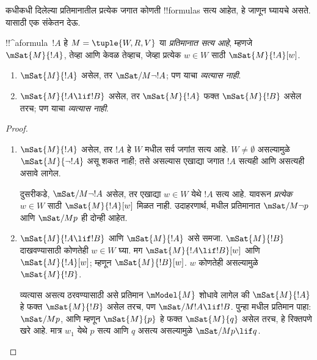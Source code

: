 \documentclass[../../../include/open-logic-section]{subfiles}
\begin{document}


कधीकधी दिलेल्या प्रतिमानातील प्रत्येक जगात कोणती !!{formula}s सत्य
आहेत, हे जाणून घ्यायचे असते. यासाठी एक संकेतन देऊ.

\begin{defn}
  !!^a{formula}~$!A$ हे $M = \tuple{W, R,
    V}$ या \emph{प्रतिमानात सत्य आहे}, म्हणजे $\mSat{M}{!A}$,
  तेव्हा आणि केवळ तेव्हाच, जेव्हा प्रत्येक $w \in W$ साठी
  $\mSat{M}{!A}[w]$.
\end{defn}

\begin{prop}
  \begin{enumerate}
  \item $\mSat{M}{!A}$ असेल, तर $\mSat/{M}{\lnot !A}$;
    पण याचा \emph{व्यत्यास नाही}.
  \item $\mSat{M}{!A \lif !B}$ असेल, तर $\mSat{M}{!A}$
    फक्त $\mSat{M}{!B}$ असेल तरच; पण याचा \emph{व्यत्यास नाही}.
  \end{enumerate}
\end{prop}

\begin{proof}
  \begin{enumerate}
  \item $\mSat{M}{!A}$ असेल, तर $!A$ हे $W$ मधील सर्व
    जगांत सत्य आहे. $W \neq \emptyset$ असल्यामुळे
    $\mSat{M}{\lnot!A}$ असू शकत नाही; तसे असल्यास
    एखाद्या जगात $!A$ सत्यही आणि असत्यही असावे लागेल.

    दुसरीकडे, $\mSat/{M}{\lnot !A}$ असेल, तर एखाद्या
    $w \in W$ येथे $!A$ सत्य आहे. यावरून \emph{प्रत्येक}
    $w \in W$ साठी $\mSat{M}{!A}[w]$ मिळत नाही. उदाहरणार्थ,
     मधील प्रतिमानात $\mSat/{M}{\lnot p}$
    आणि $\mSat/{M}{p}$ ही दोन्ही आहेत.
  \item $\mSat{M}{!A \lif !B}$ आणि $\mSat{M}{!A}$ असे समजा.
    $\mSat{M}{!B}$ दाखवण्यासाठी कोणतेही $w \in W$ घ्या.
    मग $\mSat{M}{!A \lif !B}[w]$ आणि $\mSat{M}{!A}[w]$;
    म्हणून $\mSat{M}{!B}[w]$. $w$ कोणतेही असल्यामुळे
    $\mSat{M}{!B}$.

    व्यत्यास असत्य ठरवण्यासाठी असे प्रतिमान $\mModel{M}$
    शोधावे लागेल की $\mSat{M}{!A}$ हे फक्त $\mSat{M}{!B}$
    असेल तरच, पण $\mSat/{M}{!A \lif !B}$. पुन्हा
     मधील प्रतिमान पाहा: $\mSat/{M}{p}$,
    आणि म्हणून $\mSat{M}{p}$ हे फक्त $\mSat{M}{q}$ असेल
    तरच, हे रिक्तपणे खरे आहे. मात्र $w_1$ येथे $p$ सत्य
    आणि $q$ असत्य असल्यामुळे $\mSat/{M}{p \lif
      q}$.
  \end{enumerate}
\end{proof}
\end{document}
